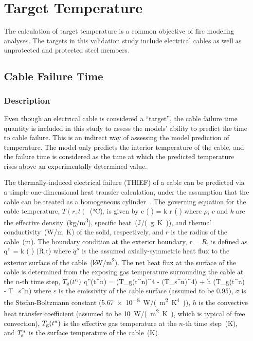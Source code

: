 
\chapter{Target Temperature}
\label{Target_Temperature_Chapter}

The calculation of target temperature is a common objective of fire modeling analyses. The targets in this validation study include electrical cables as well as unprotected and protected steel members.

\section{Cable Failure Time}
\label{sec:Cable_Failure_Time}

\subsection*{Description}

Even though an electrical cable is considered a ``target'', the cable failure time quantity is included in this study to assess the models' ability to predict the time to cable failure. This is an indirect way of assessing the model prediction of temperature. The model only predicts the interior temperature of the cable, and the failure time is considered as the time at which the predicted temperature rises above an experimentally determined value.

The thermally-induced electrical failure (THIEF) of a cable can be predicted via a simple one-dimensional heat transfer calculation, under the assumption that the cable can be treated as a homogeneous cylinder~\cite{CAROLFIRE}. The governing equation for the cable temperature,
$T(r,t)$~(\si{\celsius}), is given by
\be
\rho c \left(  \right) =   k r \left(  \right)
\label{eq:cable_temp}
\ee
where $\rho$, $c$ and $k$ are the effective density~(\si{kg/m^3}), specific heat~(\si{J/(g.K)}), and thermal conductivity~(\si{W/m.K}) of the solid, respectively, and $r$ is the radius of the cable~(\si{m}).
The boundary condition at the exterior boundary, $r = R$, is defined as
\be
\dot q'' = k \left(  \right) (R,t)
\ee
where $\dot q''$ is the assumed axially-symmetric heat flux to the exterior surface of the cable~(\si{kW/m^2}).
The net heat flux at the surface of the cable is determined from the exposing gas temperature surrounding the cable at the $n$-th time step, $T_{\rm g}(t^n)$
\be
\dot q''(t^n) = \varepsilon \sigma (T_{\rm g}(t^n)^4 - (T_{\rm s}^n)^4) + h (T_{\rm g}(t^n) - T_{\rm s}^n)
\label{eq:cable_net_heat_flux}
\ee
where $\varepsilon$ is the emissivity of the cable surface (assumed to be 0.95), $\sigma$ is the Stefan-Boltzmann constant (\SI{5.67e-8}{W/(m^2.K^4)}), $h$ is the convective heat transfer coefficient (assumed to be \SI{10}{W/(m^2.K)}, which is typical of free convection), $T_{\rm g}(t^n)$ is the effective gas temperature at the $n$-th time step~(\si{K}), and $T_{\rm s}^n$ is the surface temperature of the cable~(\si{K}).


